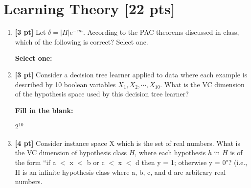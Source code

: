 \documentclass[12pt]{article}
\renewcommand{\circle}{\tikz\draw[black] (0,0) circle (1ex);}
\begin{document}
\section{Learning Theory [22 pts]}
\begin{enumerate}
    \item \textbf{[3 pt]} Let $\delta=|H|e^{-\epsilon m}$. According to the PAC theorems discussed in class, which of the following is correct? Select one.

    \textbf{Select one:}
    
    
    \item \textbf{[3 pt]} Consider a decision tree learner applied to data where each example is described by 10 boolean variables $X_1, X_2, \cdots, X_{10}$. What is the VC dimension of the hypothesis space used by this decision tree learner?
    
    \textbf{Fill in the blank:}
    
    \begin{tcolorbox}[fit,height=1cm, width=4cm, blank, borderline={1pt}{-2pt},nobeforeafter]
    
    \begin{center}\huge$2^{10}$\end{center}
    \end{tcolorbox}   
    
    
    \item \textbf{[4 pt]} Consider instance space X which is the set of real numbers. What is the VC dimension of hypothesis class $H$, where each hypothesis $h$ in $H$ is of the form  ``if a $<$ x $<$ b or c $<$ x $<$ d then y = 1; otherwise y = 0"?  (i.e., H is an infinite hypothesis class where a, b, c, and d are arbitrary real numbers.


\end{enumerate}
\end{document}

